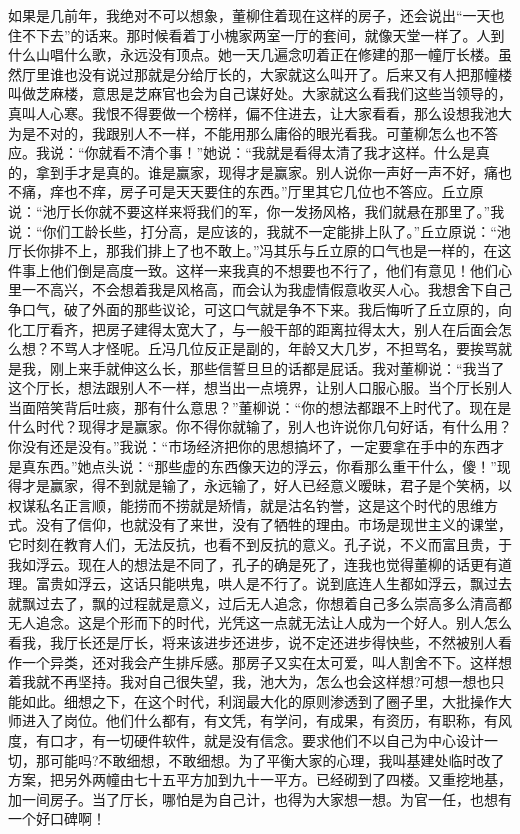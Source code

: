 \documentclass[12pt,oneside]{book}
\begin{document}
如果是几前年，我绝对不可以想象，董柳住着现在这样的房子，还会说出``一天也住不下去''的话来。那时候看着丁小槐家两室一厅的套间，就像天堂一样了。人到什么山唱什么歌，永远没有顶点。她一天几遍念叨着正在修建的那一幢厅长楼。虽然厅里谁也没有说过那就是分给厅长的，大家就这么叫开了。后来又有人把那幢楼叫做芝麻楼，意思是芝麻官也会为自己谋好处。大家就这么看我们这些当领导的，真叫人心寒。我恨不得要做一个榜样，偏不住进去，让大家看看，那么设想我池大为是不对的，我跟别人不一样，不能用那么庸俗的眼光看我。可董柳怎么也不答应。我说：``你就看不清个事！''她说：``我就是看得太清了我才这样。什么是真的，拿到手才是真的。谁是赢家，现得才是赢家。别人说你一声好一声不好，痛也不痛，痒也不痒，房子可是天天要住的东西。''厅里其它几位也不答应。丘立原说：``池厅长你就不要这样来将我们的军，你一发扬风格，我们就悬在那里了。''我说：``你们工龄长些，打分高，是应该的，我就不一定能排上队了。''丘立原说：``池厅长你排不上，那我们排上了也不敢上。''冯其乐与丘立原的口气也是一样的，在这件事上他们倒是高度一致。这样一来我真的不想要也不行了，他们有意见！他们心里一不高兴，不会想着我是风格高，而会认为我虚情假意收买人心。我想舍下自己争口气，破了外面的那些议论，可这口气就是争不下来。我后悔听了丘立原的，向化工厅看齐，把房子建得太宽大了，与一般干部的距离拉得太大，别人在后面会怎么想？不骂人才怪呢。丘冯几位反正是副的，年龄又大几岁，不担骂名，要挨骂就是我，刚上来手就伸这么长，那些信誓旦旦的话都是屁话。我对董柳说：``我当了这个厅长，想法跟别人不一样，想当出一点境界，让别人口服心服。当个厅长别人当面陪笑背后吐痰，那有什么意思？''董柳说：``你的想法都跟不上时代了。现在是什么时代？现得才是赢家。你不得你就输了，别人也许说你几句好话，有什么用？你没有还是没有。''我说：``市场经济把你的思想搞坏了，一定要拿在手中的东西才是真东西。''她点头说：``那些虚的东西像天边的浮云，你看那么重干什么，傻！''现得才是赢家，得不到就是输了，永远输了，好人已经意义暧昧，君子是个笑柄，以权谋私名正言顺，能捞而不捞就是矫情，就是沽名钓誉，这是这个时代的思维方式。没有了信仰，也就没有了来世，没有了牺牲的理由。市场是现世主义的课堂，它时刻在教育人们，无法反抗，也看不到反抗的意义。孔子说，不义而富且贵，于我如浮云。现在人的想法是不同了，孔子的确是死了，连我也觉得董柳的话更有道理。富贵如浮云，这话只能哄鬼，哄人是不行了。说到底连人生都如浮云，飘过去就飘过去了，飘的过程就是意义，过后无人追念，你想着自己多么崇高多么清高都无人追念。这是个形而下的时代，光凭这一点就无法让人成为一个好人。别人怎么看我，我厅长还是厅长，将来该进步还进步，说不定还进步得快些，不然被别人看作一个异类，还对我会产生排斥感。那房子又实在太可爱，叫人割舍不下。这样想着我就不再坚持。我对自己很失望，我，池大为，怎么也会这样想?可想一想也只能如此。细想之下，在这个时代，利润最大化的原则渗透到了圈子里，大批操作大师进入了岗位。他们什么都有，有文凭，有学问，有成果，有资历，有职称，有风度，有口才，有一切硬件软件，就是没有信念。要求他们不以自己为中心设计一切，那可能吗?不敢细想，不敢细想。为了平衡大家的心理，我叫基建处临时改了方案，把另外两幢由七十五平方加到九十一平方。已经砌到了四楼。又重挖地基，加一间房子。当了厅长，哪怕是为自己计，也得为大家想一想。为官一任，也想有一个好口碑啊！
\end{document}
